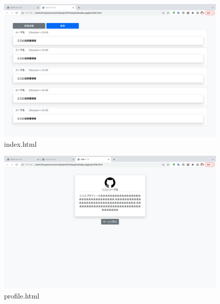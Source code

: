\documentclass[dvipdfmx]{jsarticle}
\begin{document}
    \begin{figure}[H]
        \begin{center}
            \caption*{index.html}
            \includegraphics[scale=0.3,clip]{pictures/index.png}
        \end{center}
    \end{figure}

    \begin{figure}[H]
        \begin{center}
            \caption*{profile.html}
            \includegraphics[scale=0.3,clip]{pictures/profile.png}
        \end{center}
    \end{figure}
\end{document}
